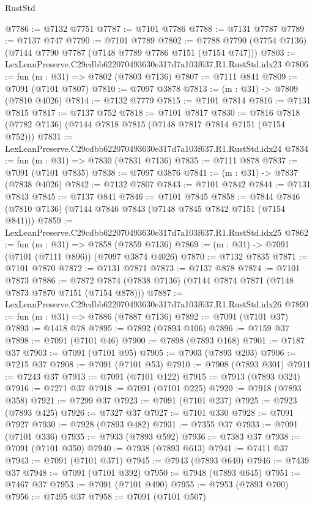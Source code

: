 \begin{lexlean}{RustStd}
\begin{coremodule}
@7786 := @7132 @7751
@7787 := @7101 @7786
@7788 := @7131 @7787
@7789 := @7137 @747
@7790 := @7101 @7789
@7802 := @7788 @7790 (@7754 @7136) (@7144 @7790 @7787 (@7148 @7789 @7786 @7151 (@7154 @747)))
@7803 := LexLeanPreserve.C29cdbb622070493630e317d7a103f637.R1.RustStd.idx23
@7806 := fun (m : @31) => @7802 (@7803 @7136)
@7807 := @7111 @841
@7809 := @7091 (@7101 @7807)
@7810 := @7097 @3878
@7813 := (m : @31) -> @7809 (@7810 @4026)
@7814 := @7132 @7779
@7815 := @7101 @7814
@7816 := @7131 @7815
@7817 := @7137 @752
@7818 := @7101 @7817
@7830 := @7816 @7818 (@7782 @7136) (@7144 @7818 @7815 (@7148 @7817 @7814 @7151 (@7154 @752)))
@7831 := LexLeanPreserve.C29cdbb622070493630e317d7a103f637.R1.RustStd.idx24
@7834 := fun (m : @31) => @7830 (@7831 @7136)
@7835 := @7111 @878
@7837 := @7091 (@7101 @7835)
@7838 := @7097 @3876
@7841 := (m : @31) -> @7837 (@7838 @4026)
@7842 := @7132 @7807
@7843 := @7101 @7842
@7844 := @7131 @7843
@7845 := @7137 @841
@7846 := @7101 @7845
@7858 := @7844 @7846 (@7810 @7136) (@7144 @7846 @7843 (@7148 @7845 @7842 @7151 (@7154 @841)))
@7859 := LexLeanPreserve.C29cdbb622070493630e317d7a103f637.R1.RustStd.idx25
@7862 := fun (m : @31) => @7858 (@7859 @7136)
@7869 := (m : @31) -> @7091 (@7101 (@7111 @896)) (@7097 @3874 @4026)
@7870 := @7132 @7835
@7871 := @7101 @7870
@7872 := @7131 @7871
@7873 := @7137 @878
@7874 := @7101 @7873
@7886 := @7872 @7874 (@7838 @7136) (@7144 @7874 @7871 (@7148 @7873 @7870 @7151 (@7154 @878)))
@7887 := LexLeanPreserve.C29cdbb622070493630e317d7a103f637.R1.RustStd.idx26
@7890 := fun (m : @31) => @7886 (@7887 @7136)
@7892 := @7091 (@7101 @37)
@7893 := @1418 @78
@7895 := @7892 (@7893 @106)
@7896 := @7159 @37
@7898 := @7091 (@7101 @46)
@7900 := @7898 (@7893 @168)
@7901 := @7187 @37
@7903 := @7091 (@7101 @95)
@7905 := @7903 (@7893 @203)
@7906 := @7215 @37
@7908 := @7091 (@7101 @53)
@7910 := @7908 (@7893 @301)
@7911 := @7243 @37
@7913 := @7091 (@7101 @122)
@7915 := @7913 (@7893 @324)
@7916 := @7271 @37
@7918 := @7091 (@7101 @225)
@7920 := @7918 (@7893 @358)
@7921 := @7299 @37
@7923 := @7091 (@7101 @237)
@7925 := @7923 (@7893 @425)
@7926 := @7327 @37
@7927 := @7101 @330
@7928 := @7091 @7927
@7930 := @7928 (@7893 @482)
@7931 := @7355 @37
@7933 := @7091 (@7101 @336)
@7935 := @7933 (@7893 @592)
@7936 := @7383 @37
@7938 := @7091 (@7101 @350)
@7940 := @7938 (@7893 @613)
@7941 := @7411 @37
@7943 := @7091 (@7101 @371)
@7945 := @7943 (@7893 @640)
@7946 := @7439 @37
@7948 := @7091 (@7101 @392)
@7950 := @7948 (@7893 @645)
@7951 := @7467 @37
@7953 := @7091 (@7101 @490)
@7955 := @7953 (@7893 @700)
@7956 := @7495 @37
@7958 := @7091 (@7101 @507)

\end{coremodule}
\end{lexlean}
